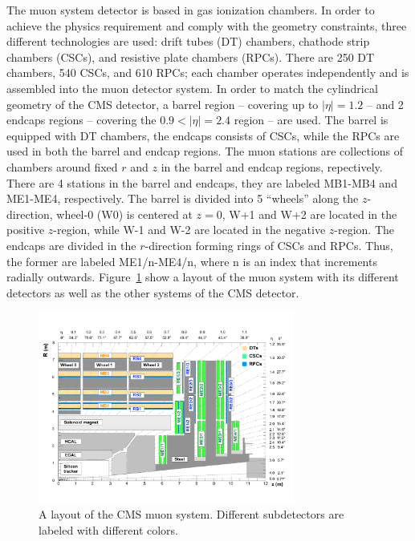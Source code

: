 The muon system detector is based in gas ionization chambers. In order
to achieve the physics requirement and comply with the geometry
constraints, three different technologies are used: drift tubes
(DT) chambers, chathode strip chambers (CSCs), and resistive plate chambers
(RPCs). There are 250 DT chambers, 540 CSCs, and 610 RPCs; each
chamber operates independently and is assembled into the muon detector
system. In order to match the cylindrical geometry of the CMS
detector, a barrel region -- covering up to $|\eta| = 1.2$ -- and 2
endcaps regions  -- covering the $ 0.9 < |\eta| = 2.4$ region --  are used. The barrel
is equipped with DT chambers, the endcaps consists of CSCs, while the
RPCs are used in both the barrel and endcap regions. The muon stations
are collections of chambers around fixed $r$ and $z$ in the barrel and
endcap regions, repectively. There are 4 stations in the barrel and
endcaps, they are labeled MB1-MB4 and ME1-ME4, respectively. The
barrel is divided into 5 ``wheels'' along the $z$-direction, wheel-0
(W0) is centered at $z=0$, W+1 and W+2 are located in the positive
$z$-region, while W-1 and W-2 are located in the negative
$z$-region. The endcaps are divided in the $r$-direction forming rings
of CSCs and RPCs. Thus, the former are labeled ME1/n-ME4/n, where n is
an index that increments radially
outwards. Figure~\ref{fig:MuonSystemLayout} show a layout of the
muon system with its different detectors as well as the other systems
of the CMS detector. 
\begin{figure}
 \centering
\includegraphics[width=0.75\textwidth]{CMS_DetectorFigures/MuonSystemLayout.pdf}
\caption{A layout of the CMS muon system. Different subdetectors are
  labeled with different colors.\label{fig:MuonSystemLayout}}
\end{figure}

